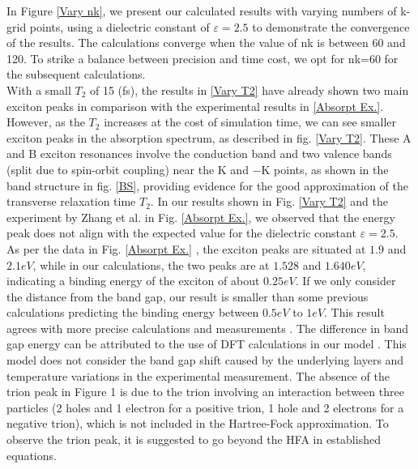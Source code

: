 \documentclass[12pt,english,a4paper]{article}
\begin{document}
\quad In Figure \ref{Vary nk}, we present our calculated results with varying numbers of k-grid points, using a dielectric constant of $\varepsilon = 2.5$ to demonstrate the convergence of the results. The calculations converge when the value of nk is between 60 and 120. To strike a balance between precision and time cost, we opt for nk=60 for the subsequent calculations.\\\null
\quad With a small $T_2$ of 15 (fs), the results in \ref{Vary T2} have already shown two main exciton peaks in comparison with the experimental results in \ref{Absorpt Ex.}. However, as the $T_2$ increases at the cost of simulation time, we can see smaller exciton peaks in the absorption spectrum, as described in fig. \ref{Vary T2}. These A and B exciton resonances involve the conduction band and two valence bands (split due to spin-orbit coupling) near the K and $-\mathrm{K}$ points, as shown in the band structure in fig. \ref{BS}, providing evidence for the good approximation of the transverse relaxation time $T_2$. In our results shown in Fig. \ref{Vary T2} and the experiment by Zhang et al. \cite{zhang_absorption_2014} in Fig. \ref{Absorpt Ex.}, we observed that the energy peak does not align with the expected value for the dielectric constant $\varepsilon = 2.5$. As per the data in Fig. \ref{Absorpt Ex.} \cite{zhang_absorption_2014}, the exciton peaks are situated at $1.9$ and $2.1 eV$, while in our calculations, the two peaks are at $1.528$ and $1.640 eV$, indicating a binding energy of the exciton of about $0.25 eV$. If we only consider the distance from the band gap, our result is smaller than some previous calculations predicting the binding energy between $0.5 eV$ to $1 eV$\cite{ramasubramaniam_large_2012,qiu_optical_2013,cheiwchanchamnangij_quasiparticle_2012, shi_quasiparticle_2013}. This result agrees with more precise calculations and measurements \cite{zhang_absorption_2014, kirichenko_influence_2021, zhang_direct_2014}. The difference in band gap energy can be attributed to the use of DFT calculations in our model \cite{liu_three-band_2013}. This model does not consider the band gap shift caused by the underlying layers and temperature variations in the experimental measurement. The absence of the trion peak in Figure 1 is due to the trion involving an interaction between three particles (2 holes and 1 electron for a positive trion, 1 hole and 2 electrons for a negative trion), which is not included in the Hartree-Fock approximation. To observe the trion peak, it is suggested to go beyond the HFA in established equations.\\
\end{document}
